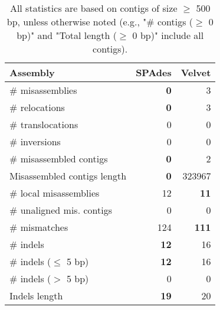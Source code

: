 \documentclass[12pt,a4paper]{article}
\begin{document}
\begin{table}[ht]
\begin{center}
\caption{All statistics are based on contigs of size $\geq$ 500 bp, unless otherwise noted (e.g., "\# contigs ($\geq$ 0 bp)" and "Total length ($\geq$ 0 bp)" include all contigs).}
\begin{tabular}{|l*{2}{|r}|}
\hline
Assembly & SPAdes & Velvet \\ \hline
\# misassemblies & {\bf 0} & 3 \\ \hline
\hspace{5mm}\# relocations & {\bf 0} & 3 \\ \hline
\hspace{5mm}\# translocations & 0 & 0 \\ \hline
\hspace{5mm}\# inversions & 0 & 0 \\ \hline
\# misassembled contigs & {\bf 0} & 2 \\ \hline
Misassembled contigs length & {\bf 0} & 323967 \\ \hline
\# local misassemblies & 12 & {\bf 11} \\ \hline
\# unaligned mis. contigs & 0 & 0 \\ \hline
\# mismatches & 124 & {\bf 111} \\ \hline
\# indels & {\bf 12} & 16 \\ \hline
\hspace{5mm}\# indels ($\leq$ 5 bp) & {\bf 12} & 16 \\ \hline
\hspace{5mm}\# indels ($>$ 5 bp) & 0 & 0 \\ \hline
Indels length & {\bf 19} & 20 \\ \hline
\end{tabular}
\end{center}
\end{table}
\end{document}
